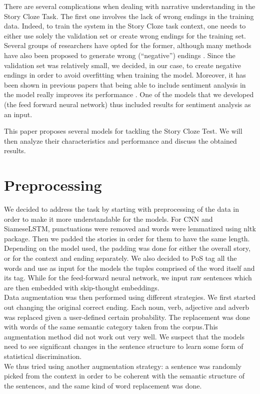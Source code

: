 \documentclass{article}
\begin{document}
There are several complications when dealing with narrative understanding in the Story Cloze Task.
The first one involves the lack of wrong endings in the training data. Indeed, to train the system in the Story Cloze task context, one needs to either use solely the validation set or create wrong endings for the training set. Several groups of researchers have opted for the former, although many methods have also been proposed to generate wrong (``negative'') endings \cite{data_aug}. Since the validation set was relatively small, we decided, in our case, to create negative endings in order to avoid overfitting when training the model. Moreover, it has been shown in previous papers that being able to include sentiment analysis in the model really improves its performance \cite{UW}\cite{sentimentgroup}\citep{sentimentgroup2}. One of the models that we developed (the feed forward neural network) thus included results for sentiment analysis as an input.

 This paper proposes several models for tackling the Story Cloze Test. We will then analyze their characteristics and performance and discuss the obtained results.

\section{Preprocessing}

We decided to address the task by starting with preprocessing of the data in order to make it more understandable for the models.
For CNN and SiameseLSTM, punctuations were removed and words were lemmatized using nltk package. Then we padded the stories in order for them to have the same length. Depending on the model used, the padding was done for either the overall story, or for the context and ending separately. We also decided to PoS tag all the words and use as input for the models the tuples comprised of the word itself and its tag. While for the feed-forward neural network, we input raw sentences which are then embedded with skip-thought embeddings.\\

Data augmentation was then performed using different strategies. We first started out changing the original correct ending. Each noun, verb, adjective and adverb was replaced given a user-defined certain probability. The replacement was done with words of the same semantic category taken from the corpus.This augmentation method did not work out very well. We suspect that the models need to see significant changes in the sentence structure to learn some form of statistical discrimination.\\
We thus tried using another augmentation strategy: a sentence was randomly picked from the context in order to be coherent with the semantic structure of the sentences, and the same kind of word replacement was done.\\
\end{document}
